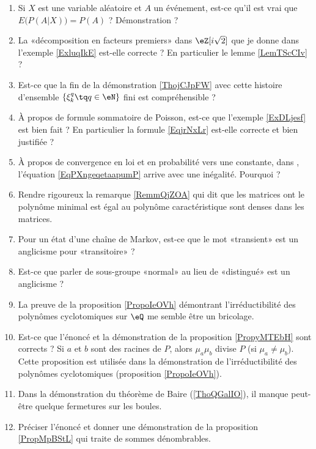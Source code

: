 \begin{enumerate}
    \item
        Si \( X\) est une variable aléatoire et \( A\) un événement, est-ce qu'il est vrai que \( E\big( P(A|X) \big)=P(A)\) ? Démonstration ?
    \item
        La «décomposition en facteurs premiers» dans \( \eZ[i\sqrt{2}]\) que je donne dans l'exemple \ref{ExluqIkE} est-elle correcte ? En particulier le lemme \ref{LemTScCIv} ?
    \item
        Est-ce que la fin de la démonstration \ref{ThojCJpFW} avec cette histoire d'ensemble \( \{ \xi_k^q\tq q\in \eN \}\) fini est compréhensible ?
    \item
        À propos de formule sommatoire de Poisson, est-ce que l'exemple \ref{ExDLjesf} est bien fait ? En particulier la formule \eqref{EqjrNxLr} est-elle correcte et bien justifiée ?
    \item
        À propos de convergence en loi et en probabilité vers une constante, dans \cite{CourgGudRennes}, l'équation \eqref{EqPXngeqetaapumP} arrive avec une inégalité. Pourquoi ?
    \item
        Rendre rigoureux la remarque \eqref{RemmQjZOA} qui dit que les matrices ont le polynôme minimal est égal au polynôme caractéristique sont denses dans les matrices.
    \item
        Pour un état d'une chaîne de Markov, est-ce que le mot «transient» est un anglicisme pour «transitoire» ?
    \item
        Est-ce que parler de sous-groupe «normal» au lieu de «distingué» est un anglicisme ?
    \item
        La preuve de la proposition \ref{PropoIeOVh} démontrant l'irréductibilité des polynômes cyclotomiques sur \( \eQ\) me semble être un bricolage.
    \item
        Est-ce que l'énoncé et la démonstration de la proposition \ref{PropyMTEbH} sont corrects ? Si \( a\) et \( b\) sont des racines de \( P\), alors \( \mu_a\mu_b\) divise \( P\) (si \( \mu_a\neq \mu_b\)). Cette proposition est utilisée dans la démonstration de l'irréductibilité des polynômes cyclotomiques (proposition \ref{PropoIeOVh}).
    \item
        Dans la démonstration du théorème de Baire (\ref{ThoQGalIO}), il manque peut-être quelque fermetures sur les boules.
    \item
        Préciser l'énoncé et donner une démonstration de la proposition \ref{PropMpBStL} qui traite de sommes dénombrables.

\end{enumerate}
